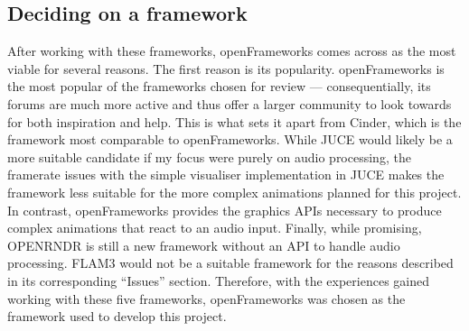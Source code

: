 \documentclass[../initial_thesis.tex]{subfiles}
\begin{document}
\subsection{Deciding on a framework}
After working with these frameworks, openFrameworks comes across as the most viable for several reasons. The first reason is its popularity. openFrameworks is the most popular of the frameworks chosen for review --- consequentially, its forums are much more active and thus offer a larger community to look towards for both inspiration and help. This is what sets it apart from Cinder, which is the framework most comparable to openFrameworks. While JUCE would likely be a more suitable candidate if my focus were purely on audio processing, the framerate issues with the simple visualiser implementation in JUCE makes the framework less suitable for the more complex animations planned for this project. In contrast, openFrameworks provides the graphics APIs necessary to produce complex animations that react to an audio input. Finally, while promising, OPENRNDR is still a new framework without an API to handle audio processing. FLAM3 would not be a suitable framework for the reasons described in its corresponding ``Issues'' section. Therefore, with the experiences gained working with these five frameworks, openFrameworks was chosen as the framework used to develop this project.
\end{document}
